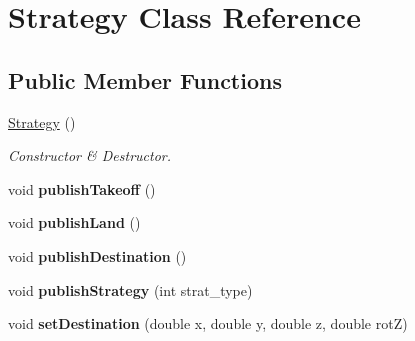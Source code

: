 \hypertarget{classStrategy}{}\section{Strategy Class Reference}
\label{classStrategy}
\subsection*{Public Member Functions}
\begin{DoxyCompactItemize}
\item 
\mbox{\label{classStrategy_a2021a15bbc4f0d13f7b92f8933db2235}} 
\hyperlink{classStrategy_a2021a15bbc4f0d13f7b92f8933db2235}{Strategy} ()
\begin{DoxyCompactList}\small\item\em Constructor \& Destructor. \end{DoxyCompactList}\item 
\mbox{\label{classStrategy_a1e81656e20e3c60210fc04ca917e7d44}} 
void {\bfseries publish\+Takeoff} ()
\item 
\mbox{\label{classStrategy_ac450376976cdcfc57e932531d84e5cad}} 
void {\bfseries publish\+Land} ()
\item 
\mbox{\label{classStrategy_a7d2f3578d82a930bdac7d2de370fcf86}} 
void {\bfseries publish\+Destination} ()
\item 
\mbox{\label{classStrategy_a1192ddc6501d9ba8d94814f4eed7d383}} 
void {\bfseries publish\+Strategy} (int strat\+\_\+type)
\item 
\mbox{\label{classStrategy_aadce56eefaf8a87f75c99291b3f83df9}} 
void {\bfseries set\+Destination} (double x, double y, double z, double rotZ)
\end{DoxyCompactItemize}
